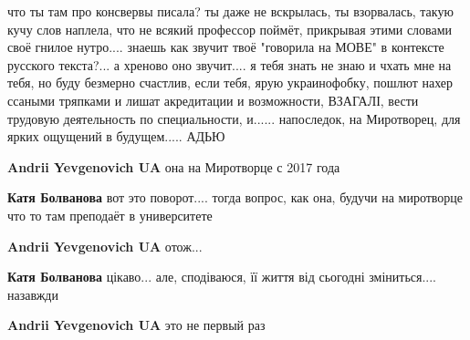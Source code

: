 \begin{itemize}
 

что ты там про консвервы писала? ты даже не вскрылась, ты взорвалась, такую
кучу слов наплела, что не всякий профессор поймёт, прикрывая этими словами своё
гнилое нутро.... знаешь как звучит твоё "говорила на МОВЕ" в контексте русского
текста?... а хреново оно звучит.... я тебя знать не знаю и чхать мне на тебя, но
буду безмерно счастлив, если тебя, ярую украинофобку, пошлют нахер ссаными
тряпками и лишат акредитации и возможности, ВЗАГАЛІ, вести трудовую
деятельность по специальности, и...... напоследок, на Миротворец, для ярких
ощущений в будущем..... АДЬЮ

\begin{itemize}
 
\textbf{Andrii Yevgenovich UA} она на Миротворце с 2017 года

 
\textbf{Катя Болванова} вот это поворот.... тогда вопрос, как она, будучи на миротворце что то там преподаёт в университете🤔

 
\textbf{Andrii Yevgenovich UA} отож...

 
\textbf{Катя Болванова} цікаво... але, сподіваюся, її життя від сьогодні зміниться.... назавжди

 
\textbf{Andrii Yevgenovich UA} это не первый раз
\end{itemize}

 

\end{itemize}
